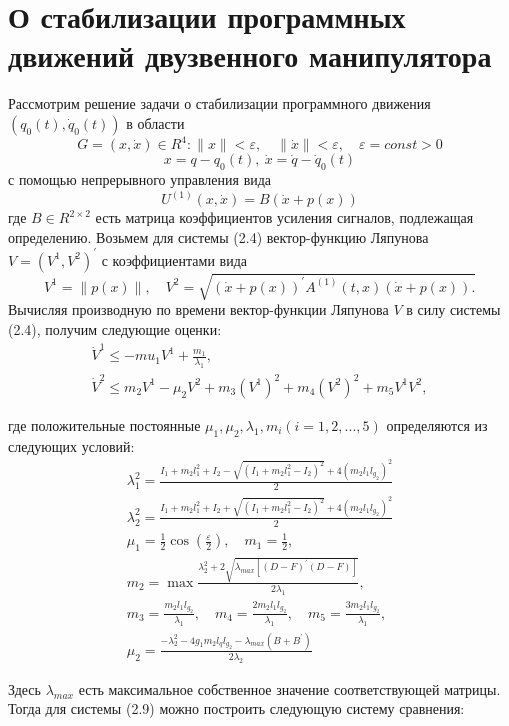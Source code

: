\section{О стабилизации программных движений двузвенного манипулятора} \label{p23}
Рассмотрим решение задачи о стабилизации программного движения $(q_0 (t), \dot q_0 (t))$ в области 
$$G = {(x, \dot x) \in R^4 : \|x\|<\varepsilon, \quad \|\dot x\|<\varepsilon, \quad \varepsilon=const>0}$$
$$x = q - q_0 (t), \ \dot x = \dot q - \dot q_0 (t)$$
с помощью непрерывного управления вида
$$U^{(1)}(x, \dot x) = B(\dot x + p(x))$$ \label{2.3'}     
где $B \in R^{2 \times 2}$ есть матрица коэффициентов усиления сигналов, подлежащая определению.
Возьмем для системы (2.4) вектор-функцию Ляпунова $V = (V^1, V^2)^{'}$  с коэффициентами вида $$V^1 = \|p(x)\|, \quad V^2 = \sqrt{(\dot x + p(x))^{'} A^{(1)}(t, x)(\dot x + p(x)).}$$
Вычисляя производную по времени вектор-функции Ляпунова $V$ в силу системы (2.4), получим следующие оценки:
\begin{equation}
\begin{array}{l}
\dot V^1 \le -mu_1 V^1 + \frac{m_1}{\lambda_1},\\
\dot V^2 \le m_2 V^1 - \mu_2 V^2 + m_3 (V^1)^2 + m_4 (V^2)^2 + m_5 V^1 V^2, 
\end{array}
\end{equation}

где положительные постоянные $\mu_1, \mu_2, \lambda_1, m_i (i=1,2,...,5)$ определяются из следующих условий:
$$
\begin{array}{l}
\displaystyle \lambda_1^2 = \frac{I_1 + m_2 l_1^2 + I_2 - \sqrt{(I_1 + m_2 l_1^2 - I_2)^2} + 4(m_2 l_1 l_{g_2})^2}{2}\\
\displaystyle \lambda_2^2 = \frac{I_1 + m_2 l_1^2 + I_2 + \sqrt{(I_1 + m_2 l_1^2 - I_2)^2} + 4(m_2 l_1 l_{g_2})^2}{2}\\
\displaystyle \mu_1 =\frac12 \cos(\frac{\varepsilon}{2}), \quad m_1 = \frac12,\\
\displaystyle m_2 = \max \frac{\lambda_2^2 + 2 \sqrt{\lambda_{max} [(D-F)^{'} (D-F)]}}{2 \lambda_1},\\
\displaystyle m_3 = \frac{m_2 l_1 l_{g_2}}{\lambda_1}, \quad m_4 = \frac{2 m_2 l_1 l_{g_2}}{\lambda_1}, \quad m_5 = \frac{3 m_2 l_1 l_{g_2}}{\lambda_1},\\
\displaystyle \mu_2 = \frac{-\lambda_2^2 - 4 g_1 m_2 l_q l_{g_2} - \lambda_{max} (B + B^{'})}{2 \lambda_2}
\end{array}
$$

Здесь $\lambda_{max}$ есть максимальное собственное значение соответствующей матрицы. 
Тогда для системы (2.9) можно построить следующую систему сравнения:

